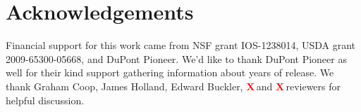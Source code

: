 \documentclass[9pt,twocolumn,twoside]{gsajnl}
\newcommand{\X}{\textcolor{red}{\bf X\,}}
\begin{document}
\section*{Acknowledgements}
Financial support for this work came from NSF grant IOS-1238014, USDA grant 2009-65300-05668, and DuPont Pioneer.  We'd like to thank DuPont Pioneer as well for their kind support gathering information about years of release. We thank Graham Coop, James Holland, Edward Buckler, \X and \X reviewers for helpful discussion. 


\end{document}
